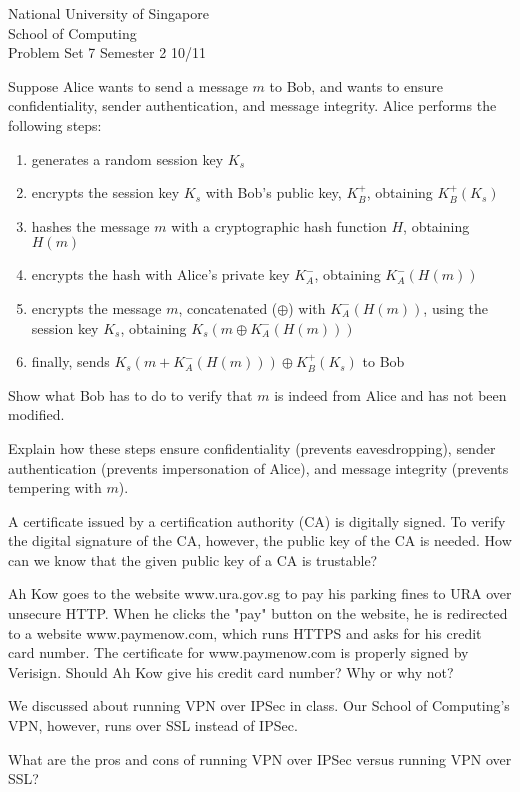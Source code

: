\documentclass[a4paper,11pt]{exam}
\begin{document}
    \extraheadheight{.5in}
    {\large\sf National University of Singapore\\ School of Computing \\
    \LARGE\sf Problem Set 7}%
    {\large\sf Semester 2 10/11}
    \firstpageheadrule
    \pagestyle{headandfoot}

    \begin{questions}

\question Suppose Alice wants to send a message $m$ to Bob, and wants to ensure confidentiality, sender authentication, and message integrity.  Alice performs the following steps:
\begin{enumerate}
	\item generates a random session key $K_s$ 
	\item encrypts the session key $K_s$ with Bob's public key, $K_B^+$, obtaining $K_B^+(K_s)$
	\item hashes the message $m$ with a cryptographic hash function $H$, obtaining $H(m)$  
	\item encrypts the hash with Alice's private key $K_A^-$, obtaining $K_A^-(H(m))$
	\item encrypts the message $m$, concatenated ($\oplus$) with $K_A^-(H(m))$, using the session key $K_s$, obtaining $K_s(m \oplus K_A^-(H(m)))$
	\item finally, sends $K_s(m + K_A^-(H(m))) \oplus K_B^+(K_s)$ to Bob
\end{enumerate}

Show what Bob has to do to verify that $m$ is indeed from Alice and has not been modified.

Explain how these steps ensure confidentiality (prevents eavesdropping), sender authentication (prevents impersonation of Alice), and message integrity (prevents tempering with $m$).

\question A certificate issued by a certification authority (CA) is digitally signed.  To verify the digital signature of the CA, however, the public key of the CA is needed.  How can we know that the given public key of a CA is trustable?

\question Ah Kow goes to the website www.ura.gov.sg to pay his parking fines to URA over unsecure HTTP.  When he clicks the "pay" button on the website, he is redirected to a website www.paymenow.com, which runs HTTPS and asks for his credit card number.  The certificate for www.paymenow.com is properly signed by Verisign.  Should Ah Kow give his credit card number?  Why or why not?

\question We discussed about running VPN over IPSec in class.  Our School of Computing's VPN, however, runs over SSL instead of IPSec.  

What are the pros and cons of running VPN over IPSec versus running VPN over SSL?  

\end{questions}
\end{document}
